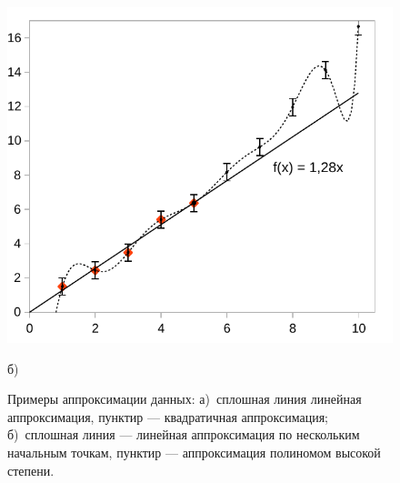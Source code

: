 \documentclass[10pt]{article}
\begin{document}
\begin{figure}[h]
\begin{minipage}[t]{0.49\columnwidth}
\begin{center}
\includegraphics[width=1\linewidth]{images/x2b.pdf}
\par\end{center}
\begin{center}
б)
\par\end{center}%
\end{minipage}

\caption{\label{fig:approx}Примеры аппроксимации данных: а)~сплошная линия
\textendash{} линейная аппроксимация, пунктир --- квадратичная
аппроксимация; б)~сплошная линия --- линейная аппроксимация
по нескольким начальным точкам, пунктир --- аппроксимация
полиномом высокой степени.}
\end{figure}
\end{document}
